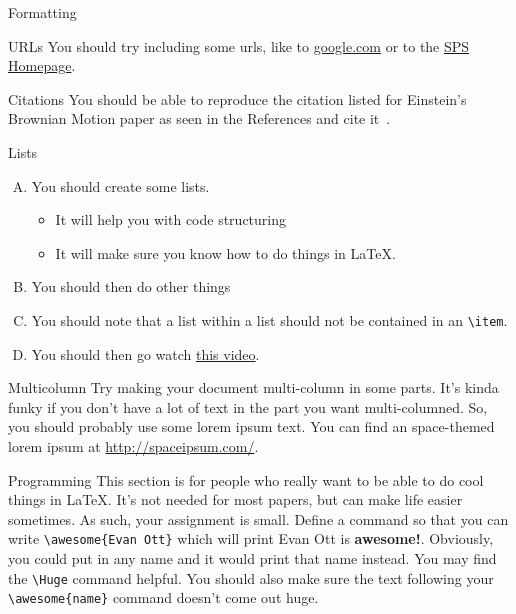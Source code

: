 \documentclass[onecolumn]{article}
\newcommand{\awesome}[1]{{\Huge #1 is \textbf{awesome!}}}
\begin{document}
\begin{section}{Formatting}
\begin{subsection}{URLs}
	You should try including some urls, like to \url{google.com} or to the \href{www.ph.utexas.edu/~sps/}{SPS Homepage}.
\end{subsection}

\begin{subsection}{Citations}
	You should be able to reproduce the citation listed for Einstein's Brownian Motion paper as seen in the References and cite it~\cite{einstein}.
\end{subsection}
\begin{subsection}{Lists}
	\begin{enumerate}[A.]
		\item{You should create some lists.}
		\begin{itemize}
			\item{It will help you with code structuring}
			\item{It will make sure you know how to do things in \LaTeX.}
			\end{itemize}
		\item{You should then do other things}
		\item{You should note that a list within a list should not be contained in an \verb+\item+.}
		\item{You should then go watch \href{http://www.youtube.com/watch?v=NfPndEB2ec0}{this video}.}
	\end{enumerate}
\end{subsection}
\begin{subsection}{Multicolumn}
	Try making your document multi-column in some parts. It's kinda funky if you don't have a lot of text in the part you want multi-columned. So, you should probably use some lorem ipsum
	text. You can find an space-themed lorem ipsum at \url{http://spaceipsum.com/}.
\end{subsection}
\end{section}
\begin{section}{Programming}
	This section is for people who really want to be able to do cool things in \LaTeX. It's not needed for most papers, but can make life easier sometimes. As such, your assignment is small.
	Define a command so that you can write \verb+\awesome{Evan Ott}+ which will print \awesome{Evan Ott}. Obviously, you  could put in any name and it would print that name instead.
	You may find the \verb+\Huge+ command helpful. You should also make sure the text following your \verb+\awesome{name}+ command doesn't come out huge.
\end{section}
\end{document}
